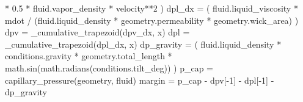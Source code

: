 \documentclass[
  12pt,
  12pt,a4paper,oneside]{report}
\newenvironment{Shaded}{}{}
\newcommand{\DecValTok}[1]{\textcolor[rgb]{0.25,0.63,0.44}{#1}}
\newcommand{\FloatTok}[1]{\textcolor[rgb]{0.25,0.63,0.44}{#1}}
\newcommand{\NormalTok}[1]{#1}
\newcommand{\OperatorTok}[1]{\textcolor[rgb]{0.40,0.40,0.40}{#1}}
\begin{document}
\begin{Shaded}
\begin{Highlighting}[]
        \OperatorTok{*} \FloatTok{0.5} \OperatorTok{*}\NormalTok{ fluid.vapor\_density }\OperatorTok{*}\NormalTok{ velocity}\OperatorTok{**}\DecValTok{2}
\NormalTok{    )}
\NormalTok{    dpl\_dx }\OperatorTok{=}\NormalTok{ (}
\NormalTok{        fluid.liquid\_viscosity }\OperatorTok{*}\NormalTok{ mdot}
        \OperatorTok{/}\NormalTok{ (fluid.liquid\_density }\OperatorTok{*}\NormalTok{ geometry.permeability }\OperatorTok{*}\NormalTok{ geometry.wick\_area)}
\NormalTok{    )}
\NormalTok{    dpv }\OperatorTok{=}\NormalTok{ \_cumulative\_trapezoid(dpv\_dx, x)}
\NormalTok{    dpl }\OperatorTok{=}\NormalTok{ \_cumulative\_trapezoid(dpl\_dx, x)}
\NormalTok{    dp\_gravity }\OperatorTok{=}\NormalTok{ (}
\NormalTok{        fluid.liquid\_density }\OperatorTok{*}\NormalTok{ conditions.gravity }\OperatorTok{*}\NormalTok{ geometry.total\_length}
        \OperatorTok{*}\NormalTok{ math.sin(math.radians(conditions.tilt\_deg))}
\NormalTok{    )}
\NormalTok{    p\_cap }\OperatorTok{=}\NormalTok{ capillary\_pressure(geometry, fluid)}
\NormalTok{    margin }\OperatorTok{=}\NormalTok{ p\_cap }\OperatorTok{{-}}\NormalTok{ dpv[}\OperatorTok{{-}}\DecValTok{1}\NormalTok{] }\OperatorTok{{-}}\NormalTok{ dpl[}\OperatorTok{{-}}\DecValTok{1}\NormalTok{] }\OperatorTok{{-}}\NormalTok{ dp\_gravity}


\end{Highlighting}
\end{Shaded}
\end{document}
